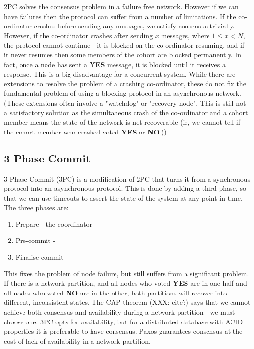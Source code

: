 \documentclass[12pt,twoside,notitlepage]{report}
\newcommand{\msg}[1] {{\bf #1}}
\begin{document}
2PC solves the consensus problem in a failure free network. However if we can have failures then
the protocol can suffer from a number of limitations. If the co-ordinator crashes before sending
any messages, we satisfy consensus trivially. However, if the co-ordinator crashes after sending
$x$ messages, where $1 \le x < N$, the protocol cannot continue - it is blocked on the
co-ordinator resuming, and if it never resumes then some members of the cohort are blocked
permanently. In fact, once a node has sent a \msg{YES} message, it is blocked until it receives a
response. This is a big disadvantage for a concurrent system. While there are extensions to
resolve the problem of a crashing co-ordinator, these do not fix the fundamental problem of using
a blocking protocol in an asynchronous network. (These extensions often involve a "watchdog" or
"recovery node". This is still not a satisfactory solution as the simultaneous crash of the
co-ordinator and a cohort member means the state of the network is not recoverable (ie, we cannot
tell if the cohort member who crashed voted \msg{YES} or \msg{NO}.))

\subsection*{3 Phase Commit}

3 Phase Commit (3PC) is a modification of 2PC that turns it from a synchronous protocol into an
asynchronous protocol. This is done by adding a third phase, so that we can use timeouts to assert
the state of the system at any point in time. The three phases are:

\begin{enumerate}
\item Prepare - the coordinator
\item Pre-commit - 
\item Finalise commit - 
\end{enumerate}

This fixes the problem of node failure, but still suffers from a significant problem. If there is
a network partition, and all nodes who voted \msg{YES} are in one half and all nodes who voted
\msg{NO} are in the other, both partitions will recover into different, inconsistent states.
The CAP theorem (XXX: cite?) says that we cannot achieve both consensus and availability
during a network partition - we must choose one. 3PC opts for availability, but for a distributed
database with ACID properties it is preferable to have consensus. Paxos guarantees consensus at
the cost of lack of availability in a network partition.
\end{document}
